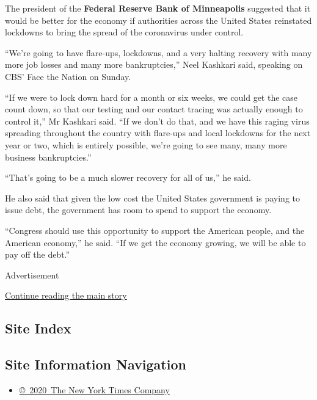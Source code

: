 The president of the \textbf{Federal Reserve Bank of Minneapolis}
suggested that it would be better for the economy if authorities across
the United States reinstated lockdowns to bring the spread of the
coronavirus under control.

``We're going to have flare-ups, lockdowns, and a very halting recovery
with many more job losses and many more bankruptcies,'' Neel Kashkari
said, speaking on CBS' Face the Nation on Sunday.

``If we were to lock down hard for a month or six weeks, we could get
the case count down, so that our testing and our contact tracing was
actually enough to control it,'' Mr Kashkari said. ``If we don't do
that, and we have this raging virus spreading throughout the country
with flare-ups and local lockdowns for the next year or two, which is
entirely possible, we're going to see many, many more business
bankruptcies.''

``That's going to be a much slower recovery for all of us,'' he said.

He also said that given the low cost the United States government is
paying to issue debt, the government has room to spend to support the
economy.

``Congress should use this opportunity to support the American people,
and the American economy,'' he said. ``If we get the economy growing, we
will be able to pay off the debt.''

Advertisement

\protect\hyperlink{after-bottom}{Continue reading the main story}

\hypertarget{site-index}{%
\subsection{Site Index}\label{site-index}}

\hypertarget{site-information-navigation}{%
\subsection{Site Information
Navigation}\label{site-information-navigation}}

\begin{itemize}
\tightlist
\item
  \href{https://help.nytimes3xbfgragh.onion/hc/en-us/articles/115014792127-Copyright-notice}{©~2020~The
  New York Times Company}
\end{itemize}

